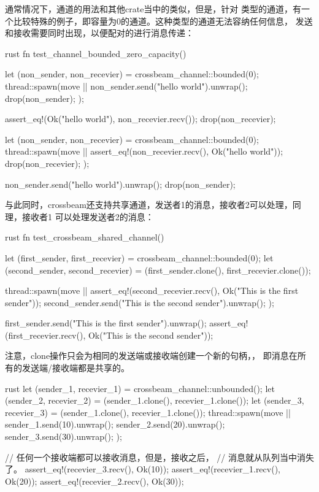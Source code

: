 通常情况下，通道的用法和其他crate当中的类似，但是，针对
类型的通道，有一个比较特殊的例子，即容量为0的通道。这种类型的通道无法容纳任何信息，
发送和接收需要同时出现，以便配对的进行消息传递：
\begin{code-block}{rust}
fn test_channel_bounded_zero_capacity() {
    let (non_sender, non_recevier) = crossbeam_channel::bounded(0);
    thread::spawn(move || {
        non_sender.send("hello world").unwrap();
        drop(non_sender);
    });

    assert_eq!(Ok("hello world"), non_recevier.recv());
    drop(non_recevier);

    let (non_sender, non_recevier) = crossbeam_channel::bounded(0);
    thread::spawn(move || {
        assert_eq!(non_recevier.recv(), Ok("hello world"));
        drop(non_recevier);
    });

    non_sender.send("hello world").unwrap();
    drop(non_sender);
}
\end{code-block}

与此同时，crossbeam还支持共享通道，发送者1的消息，接收者2可以处理，同理，接收者1
可以处理发送者2的消息：
\begin{code-block}{rust}
fn test_crossbeam_shared_channel() {
    let (first_sender, first_recevier) = crossbeam_channel::bounded(0);
    let (second_sender, second_recevier) = (first_sender.clone(), first_recevier.clone());

    thread::spawn(move || {
        assert_eq!(second_recevier.recv(), Ok("This is the first sender"));
        second_sender.send("This is the second sender").unwrap();
    });

    first_sender.send("This is the first sender").unwrap();
    assert_eq!(first_recevier.recv(), Ok("This is the second sender"));
}
\end{code-block}
注意，clone操作只会为相同的发送端或接收端创建一个新的句柄，，
即消息在所有的发送端/接收端都是共享的。
\begin{code-block}{rust}
let (sender_1, recevier_1) = crossbeam_channel::unbounded();
let (sender_2, recevier_2) = (sender_1.clone(), recevier_1.clone());
let (sender_3, recevier_3) = (sender_1.clone(), recevier_1.clone());
thread::spawn(move || {
    sender_1.send(10).unwrap();
    sender_2.send(20).unwrap();
    sender_3.send(30).unwrap();
});

// 任何一个接收端都可以接收消息，但是，接收之后，
// 消息就从队列当中消失了。
assert_eq!(recevier_3.recv(), Ok(10));
assert_eq!(recevier_1.recv(), Ok(20));
assert_eq!(recevier_2.recv(), Ok(30));
\end{code-block}

